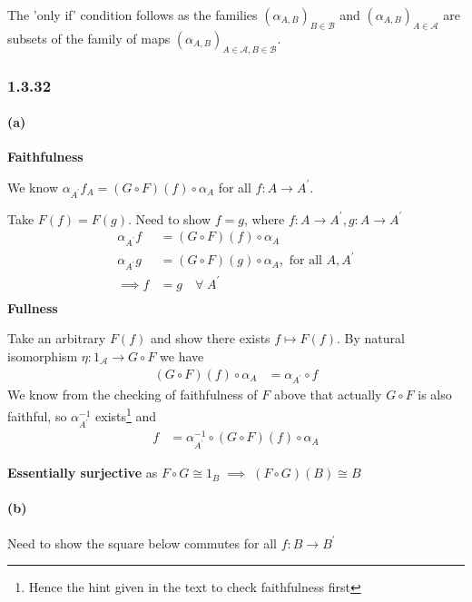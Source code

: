 \documentclass{article}
\begin{document}
The 'only if' condition follows as the families $(\alpha_{A,B})_{B \in \mathcal{B}}$ and $(\alpha_{A,B})_{A \in \mathcal{A}}$ are subsets of the family of maps $(\alpha_{A,B})_{A\in \mathcal{A}, B \in \mathcal{B}}$.

\subsubsection*{1.3.32}

\paragraph{(a)}

\textbf{Faithfulness}

We know $\alpha_{A^\prime}f_A = (G \circ F)(f) \circ \alpha_A$  for all $ f\colon A \rightarrow A^\prime$.

Take $F(f) = F(g)$. Need to show $f=g$, where $f\colon A \rightarrow A^\prime, g\colon A \rightarrow A^\prime$
\begin{align*}
  \alpha_{A^\prime}f &= (G \circ F)(f) \circ \alpha_{A}\\
  \alpha_{A^\prime}g &= (G \circ F)(g) \circ \alpha_{A}, \text{ for all } A, A^\prime\\
  \implies f &= g \quad \forall \; A^\prime \\
\end{align*}
\textbf{Fullness}

Take an arbitrary $F(f)$ and show there exists $f \mapsto F(f)$. By natural isomorphism $\eta : 1_\mathcal{A} \rightarrow G \circ F$ we have
\begin{align*}
  (G\circ F)(f) \circ \alpha_A &= \alpha_{A^\prime} \circ f
\end{align*}
We know from the checking of faithfulness of $F$ above that actually $G \circ F$ is also faithful, so $\alpha_{A^\prime}^{-1}$ exists\footnote{Hence the hint given in the text to check faithfulness first} and
\begin{align*}
  f &= \alpha_{A^\prime}^{-1} \circ (G \circ F)(f) \circ \alpha_A
\end{align*}

\textbf{Essentially surjective} as $F \circ G \cong 1_B \; \implies \; (F\circ G)(B) \cong B$

\paragraph{(b)}

Need to show the square below commutes for all $f\colon B \rightarrow B^\prime$
\end{document}
